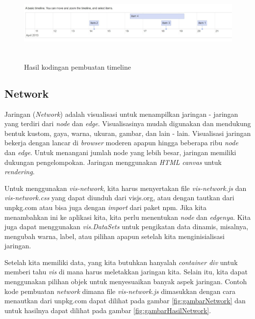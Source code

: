\begin{figure}[H]
    \centering
    \includegraphics[width=16cm, height=4cm]{Gambar/hasilTimeline.jpg}
    \caption{Hasil kodingan pembuatan timeline}
    \label{fig:gambarHasilTimeline}
\end{figure}


\newpage
\subsection{Network}
Jaringan (\textit{Network}) adalah visualisasi untuk menampilkan jaringan - jaringan yang terdiri dari \textit{node} dan \textit{edge}. Visualisasinya mudah digunakan dan mendukung bentuk kustom, gaya, warna, ukuran, gambar, dan lain - lain. Visualisasi jaringan bekerja dengan lancar di \textit{browser} moderen apapun hingga beberapa ribu \textit{node} dan \textit{edge}. Untuk menangani jumlah node yang lebih besar, jaringan memiliki dukungan pengelompokan. Jaringan menggunakan \textit{HTML canvas} untuk \textit{rendering}.

Untuk menggunakan \textit{vis-network}, kita harus menyertakan file \textit{vis-network.js} dan \textit{vis-network.css} yang dapat diunduh dari visjs.org, atau dengan tautkan dari unpkg.com atau bisa juga dengan \textit{import} dari paket npm. Jika kita menambahkan ini ke aplikasi kita, kita perlu menentukan \textit{node} dan \textit{edgenya}. Kita juga dapat menggunakan \textit{vis.DataSets} untuk pengikatan data dinamis, misalnya, mengubah warna, label, atau pilihan apapun setelah kita menginisialisasi jaringan.

Setelah kita memiliki data, yang kita butuhkan hanyalah \textit{container div} untuk memberi tahu \textit{vis} di mana harus meletakkan jaringan kita. Selain itu, kita dapat menggunakan pilihan objek untuk menyesuaikan banyak aspek jaringan. Contoh kode pembuatan \textit{network}  dimana file \textit{vis-network.js} dimasukkan dengan cara menautkan dari unpkg.com dapat dilihat pada gambar \ref{fig:gambarNetwork} dan untuk hasilnya dapat dilihat pada gambar \ref{fig:gambarHasilNetwork}.

